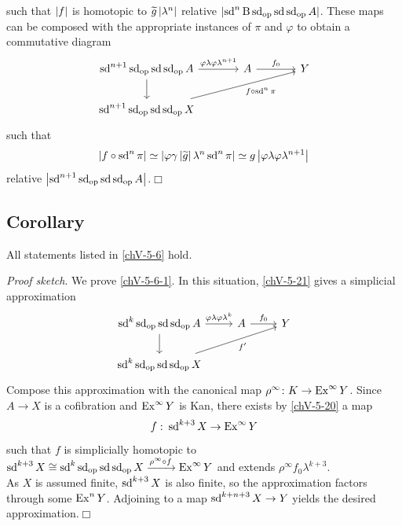         such that $\left| f \right|$ is homotopic to $\widetilde{g} \left| \lambda^n \right|$ relative $\left| \operatorname{sd}^n \operatorname{B} \operatorname{sd}_{\operatorname{op}} \operatorname{sd} \operatorname{sd}_{\operatorname{op}} A \right|$. These maps can be composed with the appropriate instances of $\pi$ and $\varphi$ to obtain a commutative diagram
        \begin{equation*}
            \begin{tikzcd}[column sep=large]
                \sd^{n+1} \sd_{\op} \sd \sd_{\op} A \arrow[d] \arrow[r, "\varphi \lambda \varphi \lambda^{n+1}"] & A \arrow[r, "f_0"] & Y \\
                \sd^{n+1} \sd_{\op} \sd \sd_{\op} X \arrow[urr, "f \circ \sd^n \pi"']
            \end{tikzcd}
        \end{equation*}
        such that
        \begin{equation*}
            \left| f \circ \operatorname{sd}^n \pi \right| \simeq \left| \varphi \gamma \left| \widetilde{g} \right| \lambda^n \operatorname{sd}^n \pi \right| \simeq g \left| \varphi \lambda \varphi \lambda^{n+1} \right|
        \end{equation*}
        relative $\left| \operatorname{sd}^{n+1} \operatorname{sd}_{\operatorname{op}} \operatorname{sd} \operatorname{sd}_{\operatorname{op}} A \right|$.\hfill$\Box$

    \subsection{Corollary}\label{chV-5-22}
        All statements listed in \ref{chV-5-6} hold.
        \smallskip

        \emph{Proof sketch}. We prove \ref{chV-5-6-1}. In this situation, \ref{chV-5-21} gives a simplicial approximation
        \begin{equation*}
            \begin{tikzcd}
                \sd^k \sd_{\op} \sd \sd_{\op} A \arrow[d] \arrow[r, "\varphi \lambda \varphi \lambda^k"] & A \arrow[r, "f_0"] & Y \\
                \sd^k \sd_{\op} \sd \sd_{\op} X \arrow[urr, "f'"']
            \end{tikzcd}
        \end{equation*}
        Compose this approximation with the canonical map $\rho^{\infty} \colon K \to \operatorname{Ex}^{\infty} Y$. Since $A \to X$ is a cofibration and $\operatorname{Ex}^{\infty} Y$ is Kan, there exists by \ref{chV-5-20} a map
        \begin{equation*}
            f \,\colon \operatorname{sd}^{k+3} X \to \operatorname{Ex}^{\infty} Y
        \end{equation*}
        such that $f$ is simplicially homotopic to $\operatorname{sd}^{k+3} X \cong \operatorname{sd}^k \operatorname{sd}_{\operatorname{op}} \operatorname{sd} \operatorname{sd}_{\operatorname{op}} X \xrightarrow{\rho^{\infty} \circ f} \operatorname{Ex}^{\infty} Y$ and extends $\rho^{\infty} f_0 \lambda^{k+3}$.\\
        As $X$ is assumed finite, $\operatorname{sd}^{k+3} X$ is also finite, so the approximation factors through some $\operatorname{Ex}^n Y$. Adjoining to a map $\operatorname{sd}^{k+n+3} X \to Y$ yields the desired approximation.\hfill$\Box$